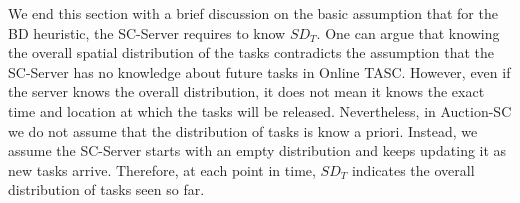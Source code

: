 We end this section with a brief discussion on the basic assumption that for the BD heuristic, the SC-Server requires to know $SD_T$. One can argue that knowing the overall spatial distribution of the tasks contradicts the assumption that the SC-Server has no knowledge about future tasks in Online TASC. However, even if the server knows the overall distribution, it does not mean it knows the exact time and location at which the tasks will be released. Nevertheless, in Auction-SC we do not assume that the distribution of tasks is know a priori. Instead, we assume the SC-Server starts with an empty distribution and keeps updating it as new tasks arrive. Therefore, at each point in time, $SD_T$ indicates the overall distribution of tasks seen so far.




